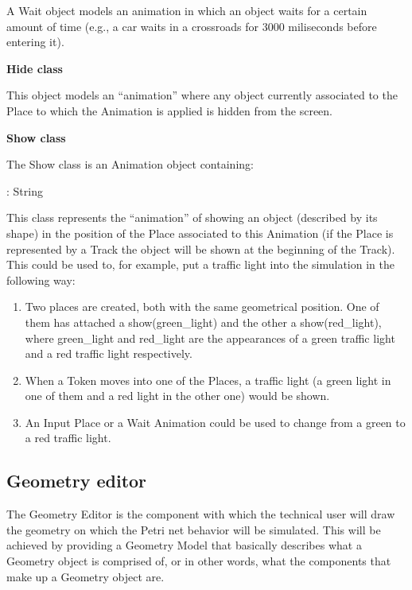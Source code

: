 A Wait object models an animation in which an object waits for a certain amount of time (e.g., a car waits in a crossroads for 3000 miliseconds before entering it).

\textbf{Hide class}

This object models an ``animation'' where any object currently associated to the Place to which the Animation is applied is hidden from the screen.

\textbf{Show class}

The Show class is an Animation object containing:

\begin{description}[labelindent=1cm]
  \item[shape]: String
\end{description}

This class represents the ``animation'' of showing an object (described by its shape) in the position of the Place associated to this Animation (if the Place is represented by a Track the object will be shown at the beginning of the Track). This could be used to, for example, put a traffic light into the simulation in the following way:

\begin{enumerate}
  \item Two places are created, both with the same geometrical position. One of them has attached a show(green\_light) and the other a 
  show(red\_light), where green\_light and red\_light are the appearances of a green traffic light and a red traffic light respectively.
  \item When a Token moves into one of the Places, a traffic light (a green light in one of them and a red light in the other one) would be shown.
  \item An Input Place or a Wait Animation could be used to change from a green to a red traffic light.
\end{enumerate}

\subsection{Geometry editor}
\label{arch:geometryeditor}
The Geometry Editor is the component with which the technical user will draw the geometry on which the Petri net behavior will be simulated. This will be achieved by providing a Geometry Model that basically describes what a Geometry object is comprised of, or in other words, what the components that make up a Geometry object are.

